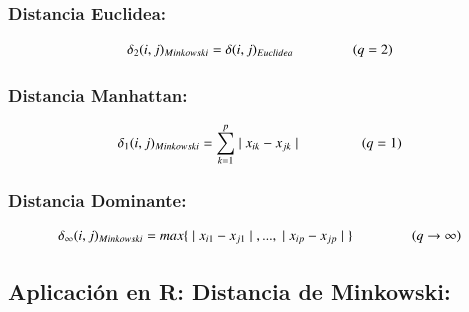 \documentclass[12pt]{report} %
\begin{document}
\subsubsection{Distancia Euclidea:  }


\begin{gather*}
 \delta_2(i,j)_{Minkowski }=\delta (i,j)_{Euclidea }   \hspace{1.5cm} (q=2)
 \end{gather*}
 
\subsubsection{Distancia Manhattan: } 

\begin{tcolorbox}[toptitle=2mm,title= Distancia Manhattan:   ]
\begin{gather*}
 \delta_1(i,j)_{Minkowski }= \sum_{k=1}^{p}  \mid x_{ik} - x_{jk} \mid \hspace{1.5cm} (q=1)
 \end{gather*}

\end{tcolorbox}

\subsubsection{Distancia Dominante: }

\begin{tcolorbox}[toptitle=2mm,title= Distancia Dominante:   ]
\begin{gather*}
 \delta_{\infty}(i,j)_{Minkowski }= max \lbrace  \hspace{0.1cm} \mid x_{i1} - x_{j1} \mid \hspace{0.1cm},...,\hspace{0.1cm} \mid x_{ip} - x_{jp} \mid \hspace{0.1cm}  \rbrace \hspace{1.5cm} (q\rightarrow \infty)
 \end{gather*}

\end{tcolorbox}

\newpage

\subsection{Aplicación en R: Distancia de Minkowski:}
\end{document}
